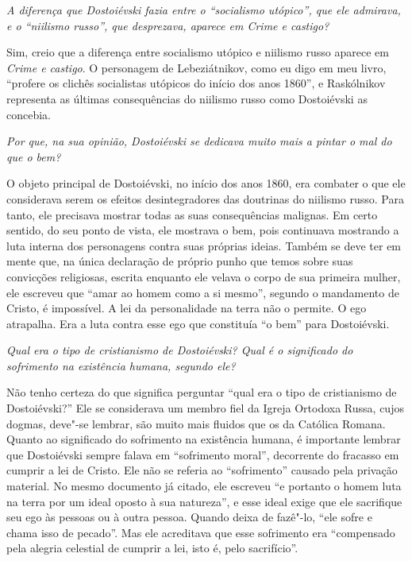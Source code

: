 {{\emph{A diferença que Dostoiévski fazia entre o ``socialismo utópico'', que
ele admirava, e o ``niilismo russo'', que desprezava, aparece em \emph{Crime e
castigo}?}

Sim, creio que a diferença entre socialismo utópico e niilismo russo
aparece em \emph{Crime e castigo}. O personagem de Lebeziátnikov, como eu
digo em meu livro, ``profere os clichês socialistas utópicos do início
dos anos 1860'', e Raskólnikov representa as últimas consequências do
niilismo russo como Dostoiévski as concebia.

\medskip

\emph{Por que, na sua opinião, Dostoiévski se dedicava muito mais a pintar
o mal do que o bem?}

O objeto principal de Dostoiévski, no início dos anos 1860, era combater
o que ele considerava serem os efeitos desintegradores das doutrinas do
niilismo russo. Para tanto, ele precisava mostrar todas as suas
consequências malignas. Em certo sentido, do seu ponto de vista, ele
mostrava o bem, pois continuava mostrando a luta interna dos personagens
contra suas próprias ideias. Também se deve ter em mente que, na única
declaração de próprio punho que temos sobre suas convicções religiosas,
escrita enquanto ele velava o corpo de sua primeira mulher, ele escreveu
que ``amar ao homem como a si mesmo'', segundo o mandamento de Cristo, é
impossível. A lei da personalidade na terra não o permite. O
ego atrapalha. Era a luta contra esse ego que constituía ``o bem'' para
Dostoiévski.

\medskip

\emph{Qual era o tipo de cristianismo de Dostoiévski? Qual é o significado
do sofrimento na existência humana, segundo ele?}

Não tenho certeza do que significa perguntar ``qual era o tipo de
cristianismo de Dostoiévski?'' Ele se considerava um membro fiel da
Igreja Ortodoxa Russa, cujos dogmas, deve"-se lembrar, são muito mais
fluidos que os da Católica Romana. Quanto ao significado do sofrimento
na existência humana, é importante lembrar que Dostoiévski sempre falava
em ``sofrimento moral'', decorrente do fracasso em cumprir a lei de
Cristo. Ele não se referia ao ``sofrimento'' causado pela privação
material. No mesmo documento já citado, ele escreveu ``e portanto o homem
luta na terra por um ideal oposto à sua natureza'', e esse
ideal exige que ele sacrifique seu ego às pessoas ou à outra pessoa.
Quando deixa de fazê"-lo, ``ele sofre e chama isso de pecado''. Mas ele
acreditava que esse sofrimento era ``compensado pela alegria celestial de
cumprir a lei, isto é, pelo sacrifício''.

}}
